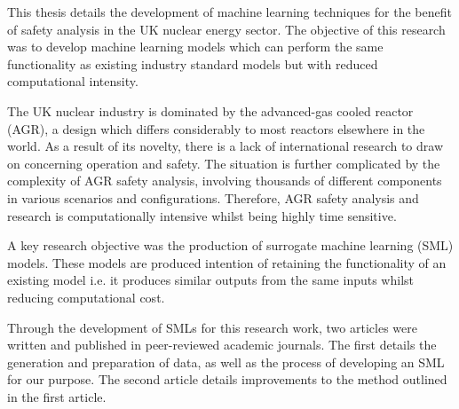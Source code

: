 %
{
	
	\singlespacing
	This thesis details the development of machine learning techniques for the benefit of safety analysis in the UK nuclear energy sector. The objective of this research was to develop machine learning models which can perform the same functionality as existing industry standard models but with reduced computational intensity.  
	
	\singlespacing
	The UK nuclear industry is dominated by the advanced-gas cooled reactor (AGR), a design which differs considerably to most reactors elsewhere in the world. As a result of its novelty, there is a lack of international research to draw on concerning operation and safety. The situation is further complicated by the complexity of AGR safety analysis, involving thousands of different components in various scenarios and configurations. Therefore, AGR safety analysis and research is computationally intensive whilst being highly time sensitive.
	
	\singlespacing
	A key research objective was the production of surrogate machine learning (SML) models. These models are produced intention of retaining the functionality of an existing model i.e. it produces similar outputs from the same inputs whilst reducing computational cost.
	
	\singlespacing
	Through the development of SMLs for this research work, two articles were written and published in peer-reviewed academic journals. The first details the generation and preparation of data, as well as the process of developing an SML for our purpose. The second article details improvements to the method outlined in the first article. 
	


}

